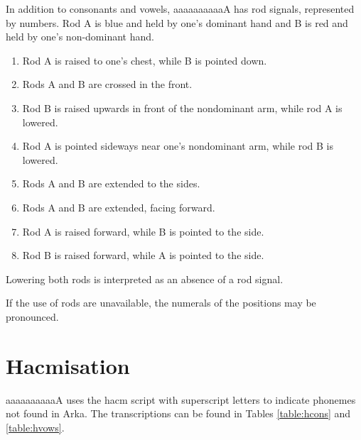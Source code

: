 \documentclass{book}
\newcommand{\lname}{aaaaaaaaaaA}
\begin{document}
In addition to consonants and vowels, \lname{} has rod signals, represented by numbers. Rod A is blue and held by one's dominant hand and B is red and held by one's non-dominant hand.

\begin{enumerate}
    \item Rod A is raised to one's chest, while B is pointed down.
    \item Rods A and B are crossed in the front.
    \item Rod B is raised upwards in front of the nondominant arm, while rod A is lowered.
    \item Rod A is pointed sideways near one's nondominant arm, while rod B is lowered.
    \item Rods A and B are extended to the sides.
    \item Rods A and B are extended, facing forward.
    \item Rod A is raised forward, while B is pointed to the side.
    \item Rod B is raised forward, while A is pointed to the side.
\end{enumerate}

Lowering both rods is interpreted as an absence of a rod signal.

If the use of rods are unavailable, the numerals of the positions may be pronounced.

\section{Hacmisation}

\lname{} uses the hacm script with superscript letters to indicate phonemes not found in Arka. The transcriptions can be found in Tables \ref{table:hcons} and \ref{table:hvows}.
\end{document}
